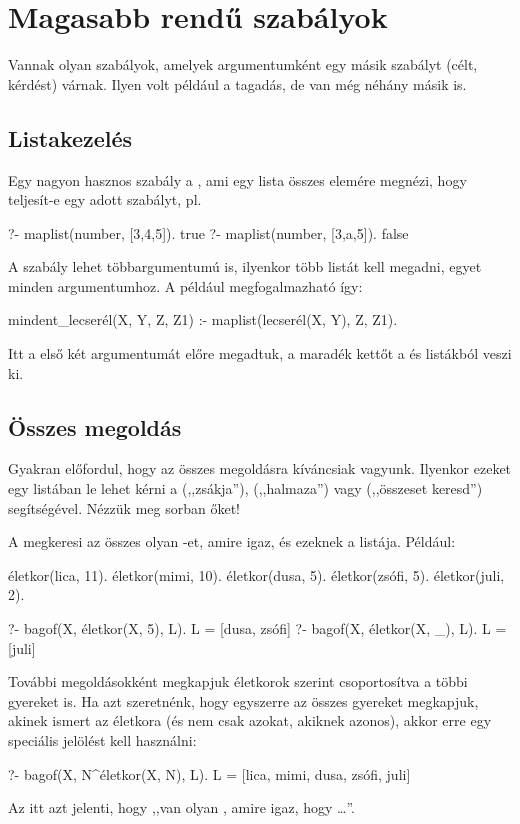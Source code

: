 \section{Magasabb rendű szabályok}
Vannak olyan szabályok, amelyek argumentumként egy
másik szabályt (célt, kérdést) várnak. Ilyen volt
például a tagadás, de van még néhány másik is.

\subsection*{Listakezelés}
Egy nagyon hasznos szabály a , ami egy
lista összes elemére megnézi, hogy teljesít-e egy
adott szabályt, pl.
\begin{query}
?- maplist(number, [3,4,5]).
true
?- maplist(number, [3,a,5]).
false
\end{query}
A szabály lehet többargumentumú is, ilyenkor több
listát kell megadni, egyet minden argumentumhoz. A
 például megfogalmazható így:
\begin{program}
mindent_lecserél(X, Y, Z, Z1) :-
    maplist(lecserél(X, Y), Z, Z1).
\end{program}
Itt a  első két argumentumát előre
megadtuk, a maradék kettőt a  és 
listákból veszi ki.

\subsection*{Összes megoldás}
Gyakran előfordul, hogy az összes megoldásra
kíváncsiak vagyunk. Ilyenkor ezeket egy listában le
lehet kérni a  (,,zsákja''), 
(,,halmaza'') vagy  (,,összeset
keresd'') segítségével. Nézzük meg sorban őket!

A  megkeresi az összes olyan
-et, amire  igaz, és  ezeknek a
listája. Például:
\begin{program}
életkor(lica, 11).
életkor(mimi, 10).
életkor(dusa, 5).
életkor(zsófi, 5).
életkor(juli, 2).
\end{program}
\begin{query}
?- bagof(X, életkor(X, 5), L).
L = [dusa, zsófi]
?- bagof(X, életkor(X, _), L).
L = [juli]
\end{query}
További megoldásokként megkapjuk életkorok szerint
csoportosítva a többi gyereket is. Ha azt
szeretnénk, hogy egyszerre az összes gyereket
megkapjuk, akinek ismert az életkora (és nem csak
azokat, akiknek azonos), akkor erre egy speciális
jelölést kell használni:
\begin{query}
?- bagof(X, N^életkor(X, N), L).
L = [lica, mimi, dusa, zsófi, juli]
\end{query}
Az  itt azt jelenti, hogy
,,van olyan , amire igaz, hogy \dots''.

